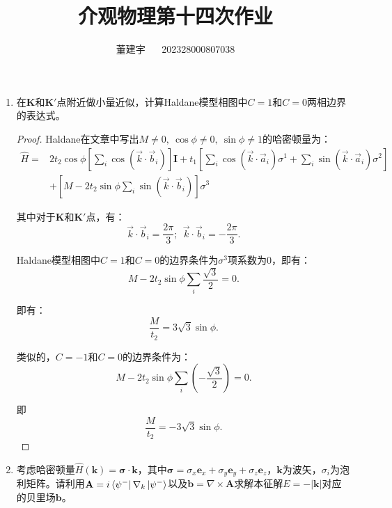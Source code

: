 \documentclass[reqno,a4paper,12pt]{amsart}
\title{介观物理第十四次作业}
\author{董建宇 ~~ 202328000807038}
\begin{document}
\maketitle

\begin{enumerate}[1.]

\item 在$\mathbf{K}$和$\mathbf{K}'$点附近做小量近似，计算Haldane模型相图中$C=1$和$C=0$两相边界的表达式。

\begin{proof}

Haldane在文章中写出$M \neq 0, \ \cos\phi\neq 0, \ \sin\phi\neq 1$的哈密顿量为：
\begin{align*}
	\hat{H} =& 2t_2\cos\phi \left[ \sum_i \cos(\vec{k}\cdot\vec{b}_i) \right] \mathbf{I} + t_1 \left[ \sum_i \cos(\vec{k}\cdot\vec{a}_i) \sigma^1 + \sum_i \sin(\vec{k}\cdot\vec{a}_i) \sigma^2 \right] \\
	&+ \left[ M - 2t_2 \sin\phi \sum_i \sin(\vec{k}\cdot\vec{b}_i) \right]\sigma^3
\end{align*}

其中对于$\mathbf{K}$和$\mathbf{K}'$点，有：
\[
	\vec{k} \cdot \vec{b}_i = \frac{2\pi}{3}; \ \ \vec{k} \cdot \vec{b}_i = -\frac{2\pi}{3}.
\]

Haldane模型相图中$C=1$和$C=0$的边界条件为$\sigma^3$项系数为$0$，即有：
\[
	M - 2t_2 \sin\phi \sum_i \frac{\sqrt{3}}{2} = 0.
\]

即有：
\[
	\frac{M}{t_2} = 3\sqrt{3}\sin\phi.
\]

类似的，$C=-1$和$C=0$的边界条件为：
\[
	M - 2t_2\sin\phi \sum_i \left( -\frac{\sqrt{3}}{2} \right) = 0.
\]

即
\[
	\frac{M}{t_2} = -3\sqrt{3}\sin\phi.
\]
\end{proof}


\item 考虑哈密顿量$\hat{H}(\mathbf{k}) = \mathbf{\sigma} \cdot \mathbf{k}$，其中$\mathbf{\sigma} = \sigma_x\mathbf{e}_x + \sigma_y\mathbf{e}_y + \sigma_z\mathbf{e}_z$，$\mathbf{k}$为波矢，$\sigma_i$为泡利矩阵。请利用$\mathbf{A} = i\bra{\psi^-} \nabla_k \ket{\psi^-}$以及$\mathbf{b} = \nabla \times \mathbf{A}$求解本征解$E = -\vert \mathbf{k} \vert$对应的贝里场$\mathbf{b}$。


\end{enumerate}
\end{document}
